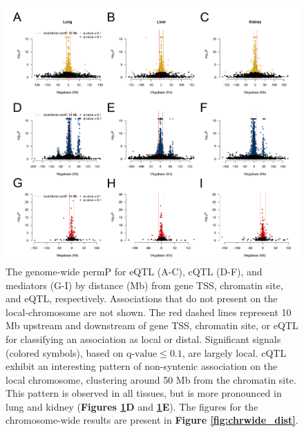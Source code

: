 \begin{figure}
\renewcommand{\familydefault}{\sfdefault}\normalfont
\centering
\includegraphics[width=\textwidth]{figures/6-mediation/genome_wide_dist.pdf}
\caption[Genome-wide association signal increases as distance decreases from gene, chromatin region, and eQTL]{The genome-wide permP for eQTL (A-C), cQTL (D-F), and mediators (G-I) by distance (Mb) from gene TSS, chromatin site, and eQTL, respectively. Associations that do not present on the local-chromosome are not shown. The red dashed lines represent 10 Mb upstream and downstream of gene TSS, chromatin site, or eQTL for classifying an association as local or distal. Significant signals (colored symbols), based on $\text{q-value} \le 0.1$, are largely local. cQTL exhibit an interesting pattern of non-syntenic association on the local chromosome, clustering around 50 Mb from the chromatin site. This pattern is observed in all tissues, but is more pronounced in lung and kidney (\textbf{Figures \ref{fig:genomewide_dist}D} and \textbf{\ref{fig:genomewide_dist}E}). The figures for the chromosome-wide results are present in \textbf{Figure \ref{fig:chrwide_dist}}.\label{fig:genomewide_dist}}
\end{figure}

